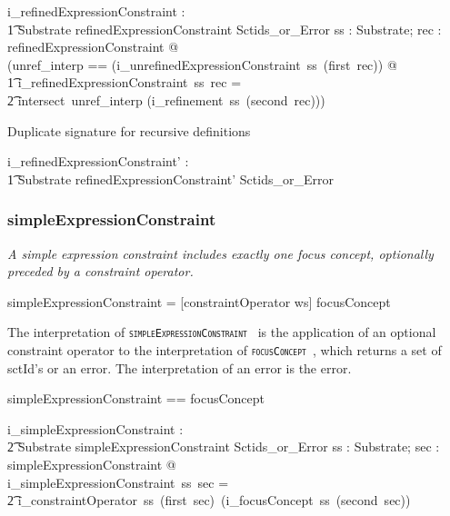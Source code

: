 \documentclass{article}
\def\spec#1{{\tt \small \textsc{{#1}} }}
\def\bnf#1{{\scriptsize {{#1}} }}
\def\desc#1{{\small \textsl{{#1}} }}
\begin{document}
\begin{gendef}
   i\_refinedExpressionConstraint : \\
\t1 Substrate \fun refinedExpressionConstraint \fun Sctids\_or\_Error
\where
   \forall ss : Substrate; rec : refinedExpressionConstraint @ \\
  (\LET unref\_interp == (i\_unrefinedExpressionConstraint~ss~(first~rec)) @ \\
\t1   i\_refinedExpressionConstraint~ss~rec = \\
\t2 intersect~unref\_interp (i\_refinement~ss~(second~rec)))
\end{gendef}

Duplicate signature for recursive definitions
\begin{gendef}
   i\_refinedExpressionConstraint' : \\
\t1 Substrate \fun refinedExpressionConstraint' \fun Sctids\_or\_Error
\end{gendef}

\subsubsection{simpleExpressionConstraint}
\begin{framed}
\desc{A simple expression constraint includes exactly one focus concept, optionally preceded by a constraint operator.}
\end{framed}
\begin{framed}
\noindent
\bnf{simpleExpressionConstraint =  [constraintOperator ws] focusConcept} 
\end{framed}

The interpretation of  \spec{simpleExpressionConstraint} is the application of an optional constraint 
operator to the interpretation of \spec{focusConcept}, which returns a set of sctId's or an error.
The interpretation of an error is the error.

\begin{zed}
simpleExpressionConstraint == \optional[constraintOperator] \cross focusConcept \\
\end{zed} 

\begin{gendef}
   i\_simpleExpressionConstraint : \\
\t2 Substrate \fun simpleExpressionConstraint \fun Sctids\_or\_Error
\where
   \forall ss : Substrate; sec : simpleExpressionConstraint @ \\
i\_simpleExpressionConstraint~ss~sec =  \\
\t2 i\_constraintOperator~ss~(first~sec)~(i\_focusConcept~ss~(second~sec))
\end{gendef}
\end{document}
